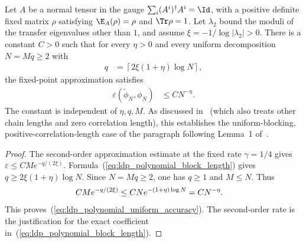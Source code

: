 \begin{lemma}%
    \label{thm:ldp_polynomial_accuracy_uniform_blocks}
    \leanok
    Let $A$ be a normal tensor in the gauge $\sum_i(A^i)^\dagger A^i=\Id$,
    with a positive definite fixed matrix $\rho$ satisfying
    $\E_A(\rho)=\rho$ and $\Tr\rho=1$.
    Let $\lambda_2$ bound the moduli of the transfer eigenvalues other than
    $1$, and assume $\xi=-1/\log|\lambda_2|>0$.
    There is a constant $C>0$ such that for every $\eta>0$ and every
    uniform decomposition $N=Mq\geq2$ with
    \begin{align}
        q & =\left\lceil2\xi(1+\eta)\log N\right\rceil,
        \label{eq:ldp_polynomial_block_length}
    \end{align}
    the fixed-point approximation satisfies
    \begin{align}
        \varepsilon(\widetilde\phi_N,\phi_N) & \leq C N^{-\eta}.
        \label{eq:ldp_polynomial_uniform_accuracy}
    \end{align}
    The constant is independent of $\eta,q,M$.
    As discussed in~\cite{gap:mswc24_polynomial_accuracy_uniform_blocks}
    (which also treats other chain lengths and zero correlation length),
    this establishes the uniform-blocking, positive-correlation-length case of
    the paragraph following Lemma~1 of~\cite{Malz2024Preparation}.
\end{lemma}
\begin{proof}\leanok
    The second-order approximation estimate at the fixed rate
    $\gamma=1/4$ gives $\varepsilon\leq C M e^{-q/(2\xi)}$.
    Formula~(\ref{eq:ldp_polynomial_block_length}) gives
    $q\geq2\xi(1+\eta)\log N$. Since $N=Mq\geq2$, one has
    $q\geq1$ and $M\leq N$. Thus
    \begin{align}
        C M e^{-q/(2\xi)}
         & \leq C N e^{-(1+\eta)\log N}=C N^{-\eta}.
        \notag
    \end{align}
    This proves~(\ref{eq:ldp_polynomial_uniform_accuracy}).
    The second-order rate is the justification for the exact coefficient
    in~(\ref{eq:ldp_polynomial_block_length}).
\end{proof}
